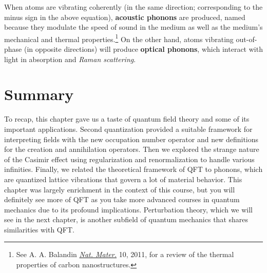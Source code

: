 When atoms are vibrating coherently (in the same direction; corresponding to the minus sign in the above equation), \textbf{acoustic phonons} are produced, named because they modulate the speed of sound in the medium as well as the medium's mechanical and thermal properties.\footnote{See A. A. Balandin \href{https://www.nature.com/nmat/journal/v10/n8/full/nmat3064.html}{\emph{Nat. Mater.}} 10, 2011, for a review of the thermal properties of carbon nanostructures.} 
On the other hand, atoms vibrating out-of-phase (in opposite directions) will produce \textbf{optical phonons}, which interact with light in absorption and \emph{Raman scattering}. 


\section{Summary}

To recap, this chapter gave us a taste of quantum field theory and some of its important applications. 
Second quantization provided a suitable framework for interpreting fields with the new occupation number operator and new definitions for the creation and annihilation operators. 
Then we explored the strange nature of the Casimir effect using regularization and renormalization to handle various infinities. 
Finally, we related the theoretical framework of QFT to phonons, which are quantized lattice vibrations that govern a lot of material behavior. 
This chapter was largely enrichment in the context of this course, but you will definitely see more of QFT as you take more advanced courses in quantum mechanics due to its profound implications. 
Perturbation theory, which we will see in the next chapter, is another subfield of quantum mechanics that shares similarities with QFT.

%